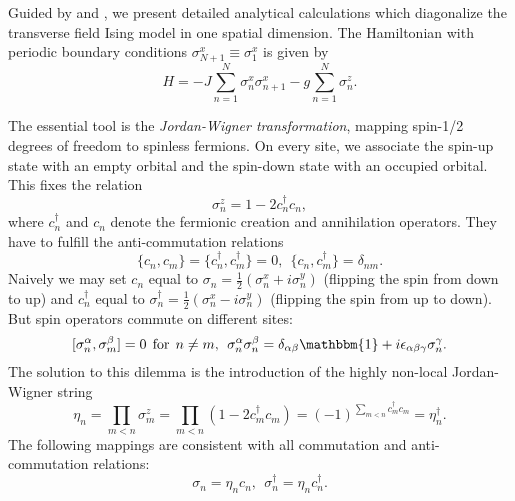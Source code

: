 Guided by \cite{pfeuty1970one} and \cite{sachdev2011quantum}, we present detailed analytical calculations which diagonalize the transverse field Ising model in one spatial dimension. The Hamiltonian with periodic boundary conditions $\sigma^x_{N+1} \equiv \sigma^x_1$ is given by
\begin{equation}\label{eq:ising_hamiltonian_1d}
	H = -J \sum_{n=1}^N \sigma^x_n \sigma^x_{n+1} - g \sum_{n=1}^N \sigma^z_n.
\end{equation}

\noindent The essential tool is the \textit{Jordan-Wigner transformation}, mapping spin-1/2 degrees of freedom to spinless fermions. On every site, we associate the spin-up state with an empty orbital and the spin-down state with an occupied orbital. This fixes the relation 
\begin{equation}\label{eq:spin_to_fermions_z}
	\sigma^z_n = 1 - 2c_n^{\dagger}c_n,
\end{equation}
where $c_n^{\dagger}$ and $c_n$ denote the fermionic creation and annihilation operators. They have to fulfill the anti-commutation relations
\begin{equation} \label{eq:fermionic_anticommutation_relations}	
	 \{c_n, c_m\} = \{c_n^{\dagger}, c_m^{\dagger}\} = 0, \:\: \{c_n, c_m^{\dagger}\} = \delta_{nm}.
\end{equation}
Naively we may set $c_n$ equal to $\sigma_n = \frac{1}{2}(\sigma^x_n + i\sigma^y_n)$ (flipping the spin from down to up) and $c^{\dagger}_n$ equal to $\sigma^{\dagger}_n = \frac{1}{2}(\sigma^x_n - i\sigma^y_n)$ (flipping the spin from up to down). But spin operators commute on different sites:
\begin{equation} \label{eq:spin_commutation_relations}	
	[\sigma^{\alpha}_n, \sigma^{\beta}_m] = 0 \:\:\mathrm{for}\:\:n \neq m, \:\: \sigma^{\alpha}_n\sigma^{\beta}_n = \delta_{\alpha\beta} \mathbbm{1} + i \epsilon_{\alpha\beta\gamma}\sigma^{\gamma}_n.
\end{equation}
The solution to this dilemma is the introduction of the highly non-local Jordan-Wigner string 
\begin{equation}
	\eta_n = \prod_{m<n}\sigma^z_m = \prod_{m<n}(1-2c_m^{\dagger}c_m) = (-1)^{\sum\limits_{m<n}c_m^{\dagger}c_m} = \eta_n^{\dagger}.
\end{equation}
The following mappings are consistent with all commutation and anti-commutation relations:
\begin{equation}
	\sigma_n = \eta_n c_n, \:\: \sigma_n^{\dagger} = \eta_n c_n^{\dagger}.
\end{equation}
